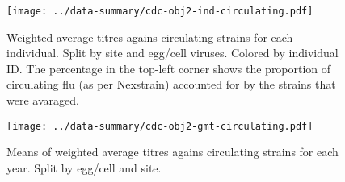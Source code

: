 \documentclass[12pt]{article}
\begin{document}
\begin{figure}
	\texttt{[image: ../data-summary/cdc-obj2-ind-circulating.pdf]}
	\caption{Weighted average titres agains circulating strains for each individual. Split by site and egg/cell viruses. Colored by individual ID.  The percentage in the top-left corner shows the proportion of circulating flu (as per Nexstrain) accounted for by the strains that were avaraged.}
	\label{fig:cdc-obj2-ind-circulating}
\end{figure}

\begin{figure}
	\texttt{[image: ../data-summary/cdc-obj2-gmt-circulating.pdf]}
	\caption{Means of weighted average titres agains circulating strains for each year. Split by egg/cell and site.}
	\label{fig:cdc-obj2-gmt-circulating}
\end{figure}
\end{document}
